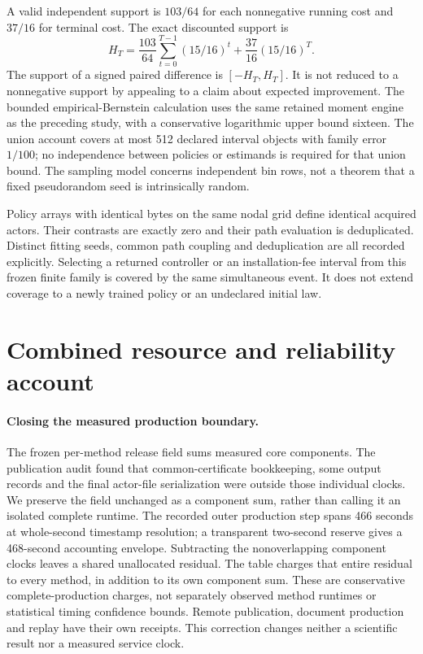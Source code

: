 A valid independent support is $103/64$ for each nonnegative running cost and $37/16$ for terminal cost. The exact discounted support is
\[
 H_T=\frac{103}{64}\sum_{t=0}^{T-1}(15/16)^t
                    +\frac{37}{16}(15/16)^T.
\]
The support of a signed paired difference is $[-H_T,H_T]$. It is not reduced to a nonnegative support by appealing to a claim about expected improvement. The bounded empirical-Bernstein calculation uses the same retained moment engine as the preceding study, with a conservative logarithmic upper bound sixteen. The union account covers at most 512 declared interval objects with family error $1/100$; no independence between policies or estimands is required for that union bound. The sampling model concerns independent bin rows, not a theorem that a fixed pseudorandom seed is intrinsically random.

Policy arrays with identical bytes on the same nodal grid define identical acquired actors. Their contrasts are exactly zero and their path evaluation is deduplicated. Distinct fitting seeds, common path coupling and deduplication are all recorded explicitly. Selecting a returned controller or an installation-fee interval from this frozen finite family is covered by the same simultaneous event. It does not extend coverage to a newly trained policy or an undeclared initial law.




\section{Combined resource and reliability account}\label{supp:resources62}
\paragraph{Closing the measured production boundary.}
The frozen per-method release field sums measured core components. The publication audit found that common-certificate bookkeeping, some output records and the final actor-file serialization were outside those individual clocks. We preserve the field unchanged as a component sum, rather than calling it an isolated complete runtime. The recorded outer production step spans 466 seconds at whole-second timestamp resolution; a transparent two-second reserve gives a 468-second accounting envelope. Subtracting the nonoverlapping component clocks leaves a shared unallocated residual. The table charges that entire residual to every method, in addition to its own component sum. These are conservative complete-production charges, not separately observed method runtimes or statistical timing confidence bounds. Remote publication, document production and replay have their own receipts. This correction changes neither a scientific result nor a measured service clock.

